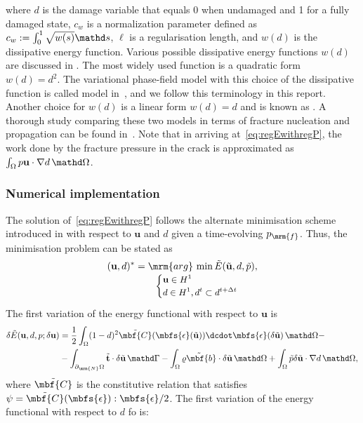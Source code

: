 where $d$ is the damage variable that equals 0 when undamaged and 1 for a fully damaged state, $c_w$ is a normalization parameter defined as $c_w:=\int_{0}^{1}\sqrt{w(s)}\mathd s$, $\ell$ is a regularisation length, and $w(d)$ is the dissipative energy function.
Various possible dissipative energy functions $w(d)$ are discussed in \cite{Marigo2016}. 
The most widely used function is a quadratic form~\cite{Bourdin2000, Kuhn2010, Miehe2010a, Klinsmann2015} $w(d) = d^2$.
The variational phase-field model with this choice of the dissipative function is called \ATtwo{} model in~\cite{Bourdin2014}, and we follow this terminology in this report.
Another choice for $w(d)$ is a linear form $w(d) = d$ and is known as \ATone{}.
A thorough study comparing these two models in terms of fracture nucleation and propagation can be found in~\cite{Tanne2018}.
Note that in arriving at~\eqref{eq:regEwithregP}, the work done by the fracture pressure in the crack is approximated as $\int_\Omega p \mathbf{u} \cdot \nabla d\, \mathd \Omega$. 


\subsubsection*{Numerical implementation}
The solution of~\eqref{eq:regEwithregP} follows the alternate minimisation scheme introduced in \cite{Bourdin2000} with respect to $\mathbf{u}$ and $d$ given a time-evolving $p_\mrm{f}$. 
Thus, the minimisation problem can be stated as
\begin{equation}
\label{eq:min_prob}
(\mathbf{u}, d)^* = \underset{\small\begin{cases} 
	\mathbf{u} \in H^1 \\ 
	d \in H^1, d^t \subset d^{t+\Delta t} \\
	\end{cases}}{\mrm{arg}\,\min \tilde{E}(\tilde{\mathbf{u}}, d, \tilde{p})},
\end{equation}
The first variation of the energy functional with respect to $\mathbf{u}$ is
\begin{align}
\label{eq:WeakForm_u}
\delta\tilde{E}(\mathbf{u},d,p; \delta \mathbf{u}) &=   
\frac{1}{2} \int_{\Omega} (1-d)^{2} \tilde{\mbf{C}}(\mbfs{\epsilon}(\tilde{\mathbf{u}}))\dcdot\mbfs{\epsilon}(\delta \tilde{\mathbf{u}})  
\, \mathd \Omega - \\
&- \int _{\partial_{\mrm{N}} \Omega} \tilde{\mathbf{t}}\cdot \delta \tilde{\mathbf{u}} \, \mathd \Gamma  
-  \int_\Omega \tilde{\varrho \mbf{b}}\cdot \delta \tilde{\mathbf{u}} \, \mathd \Omega 	
+  \int_\Omega \tilde{p} \delta \tilde{\mathbf{u}} \cdot \nabla d \, \mathd \Omega, \\
\end{align}
where $\tilde{\mbf{C}}$ is the constitutive relation that satisfies $\psi = \tilde{\mbf{C}}(\mbfs{\epsilon}):\mbfs{\epsilon}/2$. 
The first variation of the energy functional with respect to $d$ fo \ATone{} is: 

